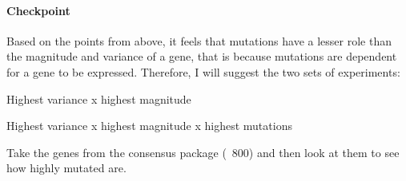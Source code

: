 \paragraph{Checkpoint}
Based on the points from above, it feels that mutations have a lesser role than the magnitude and variance of a gene, that is because mutations are dependent for a gene to be expressed. Therefore, I will suggest the two sets of experiments:
\begin{todolist}
    \item Highest variance x highest magnitude
    \item Highest variance x highest magnitude x highest mutations
    \item Take the genes from the consensus package (~800) and then look at them to see how highly mutated are.
\end{todolist}
